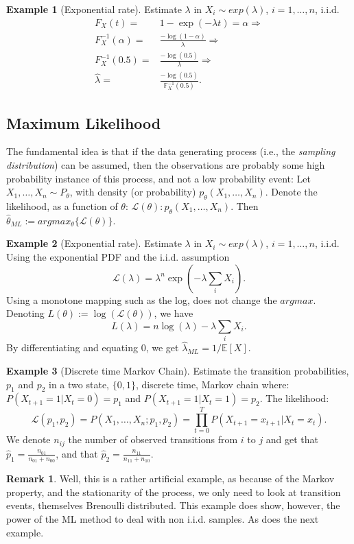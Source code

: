 \documentclass[12pt,a4paper]{article}
\theoremstyle{plain}
\theoremstyle{definition}
\newtheorem{remark}{Remark}
\newtheorem{example}{Example}
\newcommand{\expectn}[1]{\mathbb{E}[#1]}
\newcommand{\cdf}[2]{F_{#1}(#2)}
\newcommand{\icdf}[2]{F^{-1}_{#1}(#2)}
\newcommand{\icdfn}[2]{\mathbb{F}^{-1}_{#1}(#2)}
\newcommand{\lik}{\mathcal{L}}
\newcommand{\loglik}{L}
\begin{document}
\begin{example}[Exponential rate]
Estimate $\lambda$ in $X_i \sim exp(\lambda)$, $i=1,\dots,n$, i.i.d.
\begin{align*}
	  \cdf{X}{t} =& 1-\exp(-\lambda t) = \alpha \Rightarrow \\
  \icdf{X}{\alpha} =& \frac{-\log(1-\alpha)}{\lambda} \Rightarrow \\
  \icdf{X}{0.5} =& \frac{-\log(0.5)}{\lambda} \Rightarrow \\
  \hat{\lambda} =& \frac{-\log(0.5)}{\icdfn{X}{0.5}}.
\end{align*}

\end{example}


\subsection{Maximum Likelihood}
\label{sec:ml}

The fundamental idea is that if the data generating process (i.e., the \emph{sampling distribution}) can be assumed, then the observations are probably some high probability instance of this process, and not a low probability event:
Let $X_1,\dots,X_n \sim P_\theta$, with density (or probability) $p_\theta(X_1,\dots,X_n)$.
Denote the likelihood, as a function of $\theta$: $\lik(\theta): p_\theta(X_1,\dots,X_n)$.
Then $\hat{\theta}_{ML}:= argmax_{\theta}\{ \lik(\theta) \}$.

\begin{example}[Exponential rate]

Estimate $\lambda$ in $X_i \sim exp(\lambda)$, $i=1,\dots,n$, i.i.d.
Using the exponential PDF and the i.i.d. assumption
$$ \lik(\lambda) = \lambda^n \exp(-\lambda \sum_i X_i). $$
Using a monotone mapping such as the log, does not change the $argmax$. 
Denoting $\loglik(\theta):=\log(\lik(\theta))$, we have
$$ \loglik(\lambda) = n \log(\lambda) -\lambda \sum_i X_i. $$
By differentiating and equating $0$, we get $\hat{\lambda}_{ML}=1/\expectn{X}$.

\end{example}

\begin{example}[Discrete time Markov Chain]

Estimate the transition probabilities,  $p_1$ and $p_2$ in a two state, $\{0,1\}$, discrete time, Markov chain where:
$P(X_{t+1}=1|X_{t}=0)=p_1$ and $P(X_{t+1}=1|X_{t}=1)=p_2$.
The likelihood:
$$
  \lik(p_1,p_2)=P(X_1,\dots,X_n;p_1,p_2)=\prod_{t=0}^T P(X_{t+1}=x_{t+1}|X_{t}=x_t).
$$
We denote $n_{ij}$ the number of observed transitions from $i$ to $j$ and get that $\hat{p}_1=\frac{n_{01}}{n_{01}+n_{00}}$, and that $\hat{p}_2=\frac{n_{11}}{n_{11}+n_{10}}$.

\begin{remark}
Well, this is a rather artificial example, as because of the Markov property, and the stationarity of the process, we only need to look at transition events, themselves Brenoulli distributed. 
This example does show, however, the power of the ML method to deal with non i.i.d. samples. As does the next example.
\end{remark}
\end{example}
\end{document}
